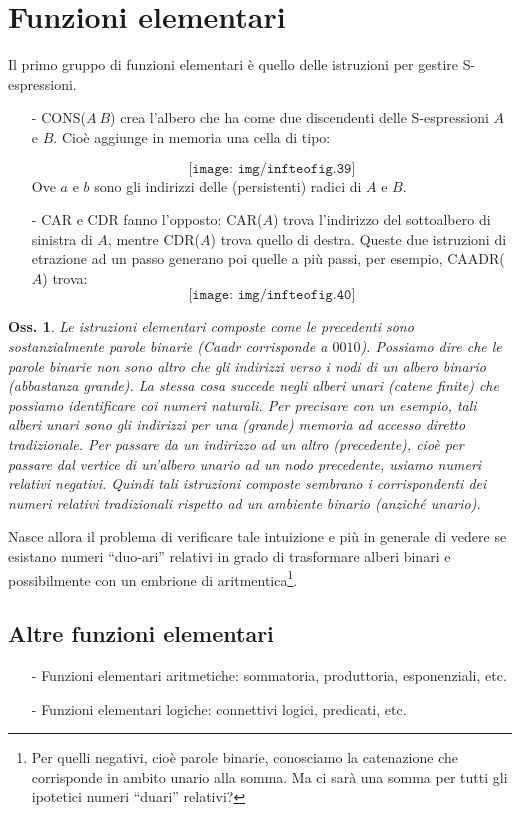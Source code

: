 \documentclass{book}
\newtheorem{osservazione}{Oss.}[chapter]
\begin{document}
\section{Funzioni elementari}
Il primo gruppo di funzioni elementari \`e quello delle istruzioni per gestire
S-espressioni.
\begin{itemize}
\item[-]CONS($A\ B$) crea l'albero che ha come due discendenti delle 
S-espressioni $A$ e $B$. Cio\`e aggiunge in memoria una cella di tipo:

\[\texttt{[image: img/infteofig.39]}\]
Ove $a$ e $b$ sono gli indirizzi delle (persistenti) radici di $A$ e $B$.
\item[-]CAR e CDR fanno l'opposto: CAR($A$) trova l'indirizzo del sottoalbero
di sinistra di $A$, mentre CDR($A$) trova quello di destra. Queste due 
istruzioni di etrazione ad un passo generano poi quelle a pi\`u passi, per 
esempio, CAADR($A$) trova:
\[\texttt{[image: img/infteofig.40]}\]
\end{itemize}

\begin{osservazione}
Le istruzioni elementari composte come le precedenti sono sostanzialmente 
parole binarie (Caadr corrisponde a $0010$). Possiamo dire che le parole 
binarie non sono altro che gli indirizzi verso i nodi di un albero binario 
(abbastanza grande). La stessa cosa succede negli alberi unari (catene finite) 
che possiamo identificare coi numeri naturali. Per precisare con un esempio, 
tali alberi unari sono gli indirizzi per una (grande) memoria ad accesso 
diretto tradizionale.
Per passare da un indirizzo ad un altro (precedente), cio\`e per passare dal 
vertice di un'albero unario ad un nodo precedente, usiamo numeri relativi 
negativi. Quindi tali istruzioni composte sembrano i corrispondenti dei numeri 
relativi tradizionali rispetto ad un ambiente binario (anzich\'e unario).
\end{osservazione}

Nasce allora il problema di verificare tale intuizione e pi\`u in generale di 
vedere se esistano numeri ``duo-ari'' relativi in grado di trasformare alberi 
binari e possibilmente con un embrione di aritmentica\footnote{Per quelli 
negativi, cio\`e parole binarie, conosciamo la catenazione che corrisponde in 
ambito unario alla somma. Ma ci sar\`a una somma per tutti gli ipotetici 
numeri ``duari'' relativi?}.

\subsection{Altre funzioni elementari}
\begin{itemize}
\item[-]Funzioni elementari aritmetiche: sommatoria, produttoria, esponenziali,
etc.
\item[-]Funzioni elementari logiche: connettivi logici, predicati, etc.
\end{itemize}
\end{document}
